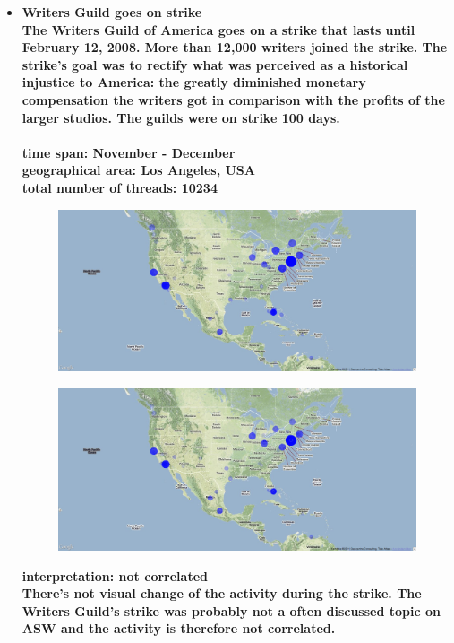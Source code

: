 \documentclass[11pt,a4paper,english]{article}
\begin{document}
\begin{itemize}
						
						
					\item \bf Writers Guild goes on strike \rm
						\\ The Writers Guild of America goes on a strike that lasts until February 12, 2008. More than 12,000 writers joined the strike. The strike's goal was to rectify what was perceived as a historical injustice to America: the greatly diminished monetary compensation the writers got in comparison with the profits of the larger studios. The guilds were on strike 100 days.
						\\\\ \bf time span: \rm November - December
						\\ \bf geographical area: \rm Los Angeles, USA
						\\ \bf total number of threads: \rm 10234
						\begin{figure}[H]
							\vspace{-5pt}
  							\begin{center}
								\includegraphics[width=130mm]{img/pre-writer}
							\end{center}
							\vspace{-13pt}
						\end{figure}
						\begin{figure}[H]
							\vspace{-13pt}
	  						\begin{center}
								\includegraphics[width=130mm]{img/post-writer}
							\end{center}
							\vspace{-5pt}
						\end{figure}	
						\bf interpretation: \rm not correlated
						\\ There's not visual change of the activity during the strike. The Writers Guild's strike was probably not a often discussed topic on ASW and the activity is therefore not correlated.
						
						
						
				\end{itemize}
			
\end{document}
